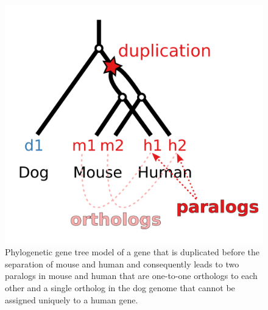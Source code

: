 \documentclass[a4paper,twoside=true,openright,parskip=full,chapterprefix=true,11pt,headings=normal,bibliography=totoc,listof=totoc,titlepage=on,captions=tableabove,draft=false]{scrreprt}
\theoremstyle{definition}
\theoremstyle{definition}
\theoremstyle{definition}
\theoremstyle{remark}
\begin{document}
\begin{figure}

{\centering \includegraphics[width=0.5\linewidth]{figures/paralog/SI/figS12} 

}

\caption{Phylogenetic gene tree model of a gene that is
duplicated before the separation of mouse and human and consequently
leads to two paralogs in mouse and human that are one-to-one orthologs
to each other and a single ortholog in the dog genome that cannot be
assigned uniquely to a human gene.}\label{fig:orthologModel}
\end{figure}
\end{document}
